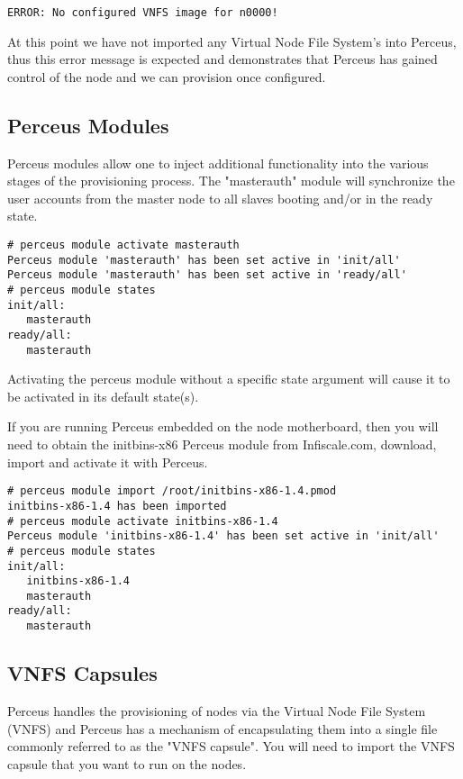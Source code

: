 \documentclass[10pt,letterpaper]{article}
\begin{document}
\begin{verbatim}
ERROR: No configured VNFS image for n0000!
\end{verbatim}

At this point we have not imported any Virtual Node File System's into
Perceus, thus this error message is expected and demonstrates that Perceus
has gained control of the node and we can provision once configured.

\subsection{Perceus Modules}
Perceus modules allow one to inject additional functionality into the
various stages of the provisioning process. The "masterauth" module will
synchronize the user accounts from the master node to all slaves booting
and/or in the ready state.

\begin{verbatim}
# perceus module activate masterauth
Perceus module 'masterauth' has been set active in 'init/all'
Perceus module 'masterauth' has been set active in 'ready/all'
# perceus module states
init/all:
   masterauth
ready/all:
   masterauth
\end{verbatim}

Activating the perceus module without a specific state argument will cause it
to be activated in its default state(s).

If you are running Perceus embedded on the node motherboard, then you will
need to obtain the initbins-x86 Perceus module from Infiscale.com, download,
import and activate it with Perceus.

\begin{verbatim}
# perceus module import /root/initbins-x86-1.4.pmod
initbins-x86-1.4 has been imported
# perceus module activate initbins-x86-1.4
Perceus module 'initbins-x86-1.4' has been set active in 'init/all'
# perceus module states
init/all:
   initbins-x86-1.4
   masterauth
ready/all:
   masterauth
\end{verbatim}


\subsection{VNFS Capsules}
Perceus handles the provisioning of nodes via the Virtual Node File
System (VNFS) and Perceus has a mechanism of encapsulating them into a
single file commonly referred to as the "VNFS capsule". You will need to
import the VNFS capsule that you want to run on the nodes.
\end{document}
